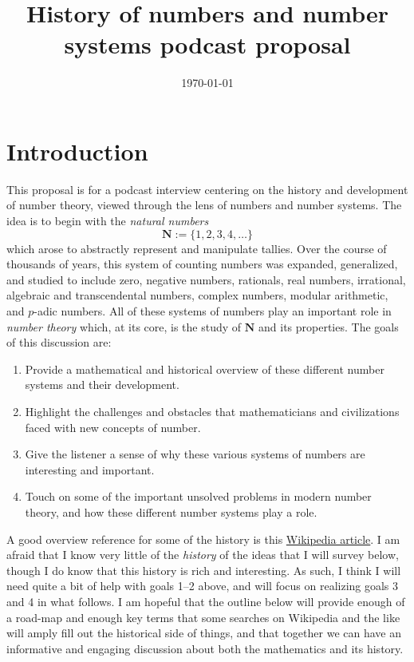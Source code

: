 \documentclass[11pt]{amsart}
\newcommand*{\N}{\ensuremath{\mathbf{N}}}
\theoremstyle{plain}
\theoremstyle{definition}
\theoremstyle{remark}
\numberwithin{theorem}{section}
\numberwithin{equation}{section}
\begin{document}
\title{History of numbers and number systems podcast proposal}




\subjclass[2010]{}
\keywords{}
\date{\today}



\maketitle

\section{Introduction}

This proposal is for a podcast interview centering on the history and development of number theory, 
viewed through the lens of numbers and number systems.  The idea is to begin with the {\em natural numbers}
$$
\N:=\{1,2,3,4,\ldots\}
$$
which arose to abstractly represent and manipulate tallies.  Over the course of thousands of years, this
system of counting numbers was expanded, generalized, and studied to include zero, negative numbers,
rationals, real numbers, irrational, algebraic and transcendental numbers, complex numbers, 
modular arithmetic, and $p$-adic numbers.  All of these systems of numbers play an important role in
{\em number theory} which, at its core, is the study of $\N$ and its properties.  The goals of this discussion are:
\begin{enumerate}
	\item Provide a mathematical and historical overview of these different number systems and their development.
	\item Highlight the challenges and obstacles that mathematicians and civilizations faced with new concepts of number.
	\item Give the listener a sense of why these various systems of numbers are interesting and important.
	\item Touch on some of the important unsolved problems in modern number theory, and how these different number systems play a role.
\end{enumerate} 
A good overview reference for some of the history is this \href{https://en.wikipedia.org/wiki/Number}{Wikipedia article}.
I am afraid that I know very little of the {\em history} of the ideas that I will survey below, though I do know that this history is
rich and interesting.  As such, I think I will need quite a bit of help with goals 1--2 above, and will focus on realizing goals 3 and 4 in what follows.
I am hopeful that the outline below will provide enough of a road-map and enough key terms that some searches on Wikipedia 
and the like will amply fill out the historical side of things, and that together we can have an informative and engaging discussion
about both the mathematics and its history.
\end{document}
